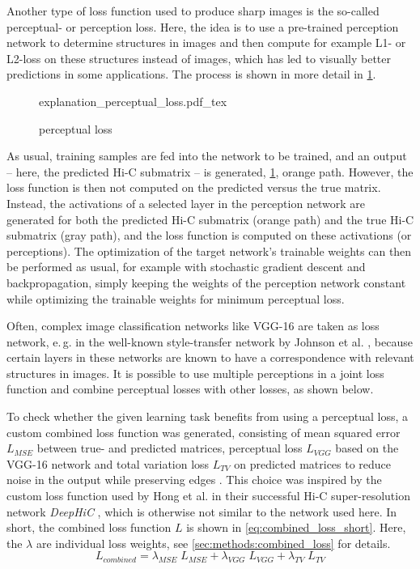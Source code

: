 Another type of loss function used to produce sharp images is the so-called perceptual- or perception loss.
Here, the idea is to use a pre-trained perception network to determine structures in images and then compute for example L1- or L2-loss on these structures instead of images,
which has led to visually better predictions in some applications.
The process is shown in more detail in \cref{fig:improve:perceptual_loss}. 
\begin{figure}[hbt]
    \small
    \centering
    {explanation_perceptual_loss.pdf_tex}%
    \caption{perceptual loss}
    \label{fig:improve:perceptual_loss}
\end{figure}

As usual, training samples are fed into the network to be trained, and an output -- here, the predicted Hi-C submatrix -- is generated,
\cref{fig:improve:perceptual_loss}, orange path.
However, the loss function is then not computed on the predicted versus the true matrix. 
Instead, the activations of a selected layer in the perception network are generated for both the predicted Hi-C submatrix (orange path)
and the true Hi-C submatrix (gray path), and the loss function is computed on these activations (or perceptions).
The optimization of the target network's trainable weights can then be performed as usual, for example with stochastic gradient descent and backpropagation, 
simply keeping the weights of the perception network constant while optimizing the trainable weights for minimum perceptual loss.

Often, complex image classification networks like VGG-16 \cite{Simonyan2015} are taken as loss network, 
e.\,g. in the well-known style-transfer network by Johnson et al. \cite{Johnson2016},
because certain layers in these networks are known to have a correspondence with relevant structures in images.
It is possible to use multiple perceptions in a joint loss function \cite{Johnson2016} and combine perceptual losses with other losses, as shown below.

To check whether the given learning task benefits from using a perceptual loss, a custom combined loss function was generated,
consisting of mean squared error $L_\mathit{MSE}$ between true- and predicted matrices, perceptual loss $L_\mathit{VGG}$ based on the VGG-16 network 
and total variation loss $L_\mathit{TV}$ on predicted matrices to reduce noise in the output while preserving edges \cite{Rudin1992}. 
This choice was inspired by the custom loss function used by Hong et al. in their successful Hi-C super-resolution network \emph{DeepHiC} \cite{Hong2020},
which is otherwise not similar to the network used here.
In short, the combined loss function $L$ is shown in \cref{eq:combined_loss_short}. 
Here, the $\lambda$ are individual loss weights, see \cref{sec:methods:combined_loss} for details.
\begin{equation}
 L_\mathit{combined} = \lambda_\mathit{MSE} \; L_\mathit{MSE} + \lambda_\mathit{VGG} \; L_\mathit{VGG} + \lambda_\mathit{TV} \; L_\mathit{TV} \label{eq:combined_loss_short}
\end{equation}

